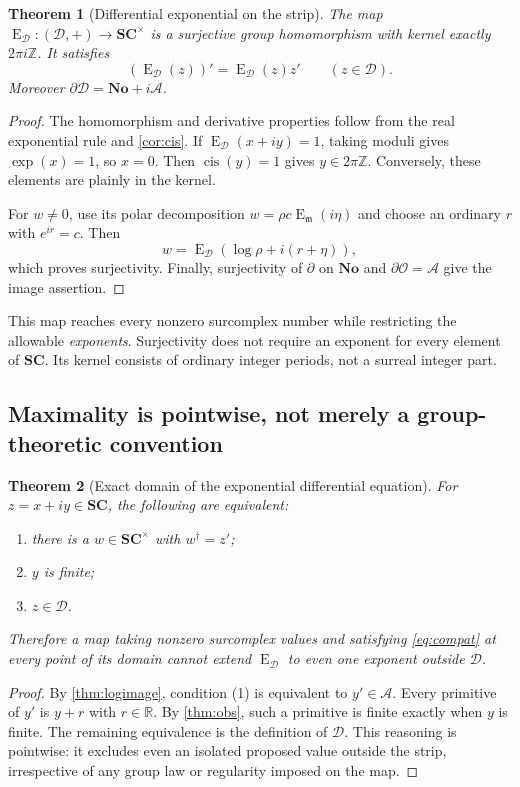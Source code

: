\documentclass[11pt,letterpaper]{article}
\numberwithin{equation}{section}
\newtheorem{theorem}{Theorem}[section]
\theoremstyle{definition}
\theoremstyle{remark}
\newcommand{\No}{\mathbf{No}}
\newcommand{\SC}{\mathbf{SC}}
\newcommand{\R}{\mathbb R}
\newcommand{\Z}{\mathbb Z}
\newcommand{\OO}{\mathcal O}
\newcommand{\mm}{\mathfrak m}
\newcommand{\ARate}{\mathcal A}
\newcommand{\DD}{\mathcal D}
\newcommand{\der}{\partial}
\newcommand{\cis}{\operatorname{cis}}
\newcommand{\Em}{\operatorname{E}_{\mm}}
\newcommand{\Ed}{\operatorname{E}_{\DD}}
\begin{document}
\begin{theorem}[Differential exponential on the strip]\label{thm:strip}
The map $\Ed:(\DD,+)\to\SC^\times$ is a surjective group homomorphism with kernel exactly $2\pi i\Z$. It satisfies
\begin{equation}\label{eq:compat}
 (\Ed(z))'=\Ed(z)z'\qquad(z\in\DD).
\end{equation}
Moreover $\der\DD=\No+i\ARate$.
\end{theorem}
\begin{proof}
The homomorphism and derivative properties follow from the real exponential rule and \cref{cor:cis}. If $\Ed(x+iy)=1$, taking moduli gives $\exp(x)=1$, so $x=0$. Then $\cis(y)=1$ gives $y\in2\pi\Z$. Conversely, these elements are plainly in the kernel.

For $w\ne0$, use its polar decomposition $w=\rho c\Em(i\eta)$ and choose an ordinary $r$ with $e^{ir}=c$. Then
\[
 w=\Ed(\log\rho+i(r+\eta)),
\]
which proves surjectivity. Finally, surjectivity of $\der$ on $\No$ and $\der\OO=\ARate$ give the image assertion.
\end{proof}

This map reaches every nonzero surcomplex number while restricting the allowable \emph{exponents}. Surjectivity does not require an exponent for every element of $\SC$. Its kernel consists of ordinary integer periods, not a surreal integer part.

\subsection{Maximality is pointwise, not merely a group-theoretic convention}
\begin{theorem}[Exact domain of the exponential differential equation]\label{thm:maximal}
For $z=x+iy\in\SC$, the following are equivalent:
\begin{enumerate}
\item there is a $w\in\SC^\times$ with $w^\dagger=z'$;
\item $y$ is finite;
\item $z\in\DD$.
\end{enumerate}
Therefore a map taking nonzero surcomplex values and satisfying \eqref{eq:compat} at every point of its domain cannot extend $\Ed$ to even one exponent outside $\DD$.
\end{theorem}
\begin{proof}
By \cref{thm:logimage}, condition (1) is equivalent to $y'\in\ARate$. Every primitive of $y'$ is $y+r$ with $r\in\R$. By \cref{thm:obs}, such a primitive is finite exactly when $y$ is finite. The remaining equivalence is the definition of $\DD$. This reasoning is pointwise: it excludes even an isolated proposed value outside the strip, irrespective of any group law or regularity imposed on the map.
\end{proof}
\end{document}
